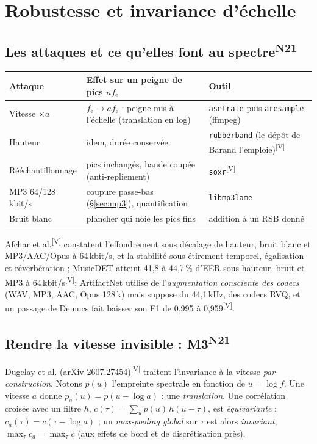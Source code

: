 \documentclass[10pt,a4paper]{article}
\newcommand{\sV}{\textsuperscript{\scriptsize\textcolor{green!40!black}{[V]}}}
\newcommand{\nref}[1]{\textsuperscript{\scriptsize\textcolor{black!55}{#1}}}
\begin{document}
\section{Robustesse et invariance d'échelle}\label{sec:robust}

\subsection{Les attaques et ce qu'elles font au spectre\nref{N21}}
\begin{center}\footnotesize
\begin{tabularx}{\textwidth}{@{}L{2.5cm}L{5.4cm}X@{}}
\toprule
\textbf{Attaque} & \textbf{Effet sur un peigne de pics $nf_{\mathrm e}$} & \textbf{Outil}\\
\midrule
Vitesse $\times a$ & $f_{\mathrm e}\to af_{\mathrm e}$ : peigne mis à l'échelle (translation en log) & \texttt{asetrate} puis \texttt{aresample} (ffmpeg)\\
Hauteur & idem, durée conservée & \texttt{rubberband} (le dépôt de Barand l'emploie)\sV\\
Rééchantillonnage & pics inchangés, bande coupée (anti-repliement) & \texttt{soxr}\sV\\
MP3 64/128\,kbit/s & coupure passe-bas (§\ref{sec:mp3}), quantification & \texttt{libmp3lame}\\
Bruit blanc & plancher qui noie les pics fins & addition à un RSB donné\\
\bottomrule
\end{tabularx}
\end{center}
Afchar et al.\sV{} constatent l'effondrement sous décalage de hauteur, bruit blanc et MP3/AAC/Opus à 64\,kbit/s, et la stabilité sous étirement temporel, égalisation et réverbération ; MusicDET atteint 41,8 à 44,7\,\% d'EER sous hauteur, bruit et MP3 à 64\,kbit/s\sV ; ArtifactNet utilise de l'\emph{augmentation consciente des codecs} (WAV, MP3, AAC, Opus 128\,k) mais suppose du 44,1\,kHz, des codecs RVQ, et un passage de Demucs fait baisser son F1 de 0,995 à 0,959\sV.

\subsection{Rendre la vitesse invisible : M3\nref{N21}}
Dugelay et al. (arXiv 2607.27454)\sV{} traitent l'invariance à la vitesse \emph{par construction}. Notons $p(u)$ l'empreinte spectrale en fonction de $u=\log f$. Une vitesse $a$ donne $p_a(u)=p(u-\log a)$ : une \emph{translation}. Une corrélation croisée avec un filtre $h$, $c(\tau)=\sum_u p(u)\,h(u-\tau)$, est \emph{équivariante} : $c_a(\tau)=c(\tau-\log a)$ ; un \emph{max-pooling global} sur $\tau$ est alors \emph{invariant}, $\max_\tau c_a=\max_\tau c$ (aux effets de bord et de discrétisation près).
\end{document}
